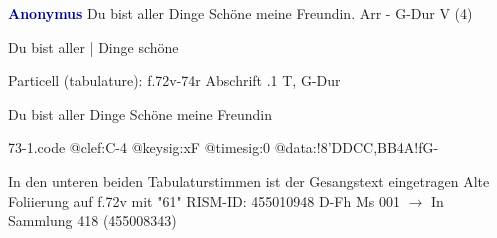 \documentclass[twocolumn]{book}
\begin{document}
\newline \par \vspace{7pt} \textcolor{darkblue}{\textbf{Anonymus  }}
\newline Du bist aller Dinge Schöne meine Freundin. Arr - G-Dur
\newline V (4)
\newline \begin{itshape}[f.72v, at left:] Du bist aller | Dinge schöne\end{itshape} 
\newline \textcolor{darkblue}{}  Particell (tabulature): f.72v-74r
\newline Abschrift
.1  T, G-Dur
\newline \begin{footnotesize} Du bist aller Dinge Schöne meine Freundin \end{footnotesize}  
\begin{filecontents*}{73-1.code}
@clef:C-4
@keysig:xF
@timesig:0
@data:!{8'DDCC}{,BB}4A!fG-
\end{filecontents*}
\newline
%
\newline In den unteren beiden Tabulaturstimmen ist der Gesangstext eingetragen
\newline Alte Foliierung auf f.72v mit "61"
\newline RISM-ID: 455010948
\newline D-Fh  Ms 001
\newline $\rightarrow$ In Sammlung 418 (455008343)
      
\end{document}
